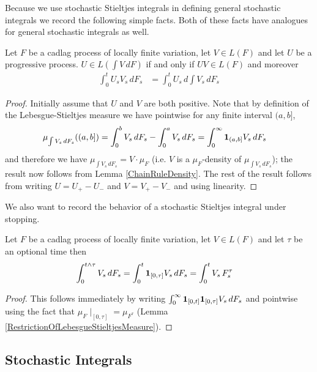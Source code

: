 Because we use stochastic Stieltjes integrals in defining general stochastic integrals we record the following simple facts.  Both of these facts have analogues for general stochastic integrals as well.
\begin{lem}\label{ChainRuleStieltjes}Let $F$ be a cadlag process of locally finite variation, let $V \in L(F)$ and let $U$ be a progressive process.  $U \in L(\int V \, dF)$ if and only if $UV \in L(F)$ and moreover
\begin{align*}
\int_0^t U_s V_s \, dF_s &= \int_0^t U_s \, d\int V_s \, dF_s
\end{align*}
\end{lem}
\begin{proof}
Initially assume that $U$ and $V$ are both positive.  Note that by definition of the Lebesgue-Stieltjes measure we have pointwise for any finite interval $(a,b]$,
\begin{align*}
\mu_{\int V_s \, dF_s}((a,b]) &= \int_0^b V_s \, dF_s - \int_0^a V_s \, dF_s = \int_0^\infty \textbf{1}_{(a,b]} V_s \, dF_s
\end{align*}
and therefore we have $\mu_{\int V_s \, dF_s} = V \cdot \mu_F$ (i.e. $V$ is a $\mu_F$-density of $\mu_{\int V_s \, dF_s}$); the result now follows from Lemma \ref{ChainRuleDensity}.  The rest of the result follows from writing $U = U_+ - U_-$ and $V = V_+ - V_-$ and using linearity.
\end{proof}

We also want to record the behavior of a stochastic Stieltjes integral under stopping.
\begin{lem}\label{StoppingStieltjes}Let $F$ be a cadlag process of locally finite variation, let $V \in L(F)$ and let $\tau$ be an optional time then
\begin{align*}
\int_0^{t \wedge \tau} V_s \, dF_s &= \int_0^t \textbf{1}_{[0,\tau]} V_s \, dF_s = \int_0^t V_s \, F^{\tau}_s
\end{align*}
\end{lem}
\begin{proof}
This follows immediately by writing $\int_0^\infty \textbf{1}_{[0,t]} \textbf{1}_{[0,\tau]} V_s \, dF_s$ and pointwise using the fact that $\mu_F \mid_{[0, \tau]} = \mu_{F^\tau}$ (Lemma \ref{RestrictionOfLebesgueStieltjesMeasure}).
\end{proof}

\subsection{Stochastic Integrals}

